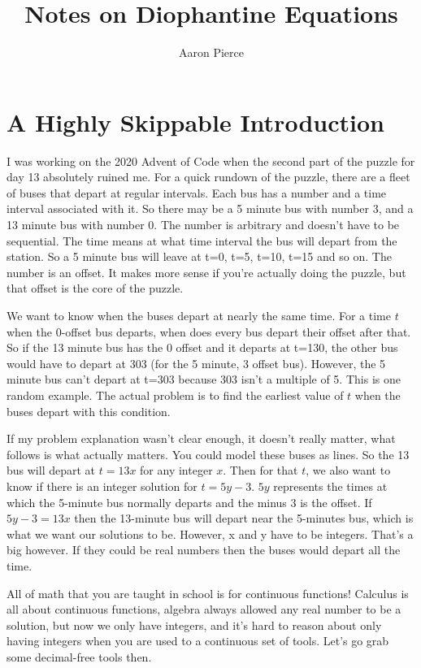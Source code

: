 \documentclass{article}
\title{Notes on Diophantine Equations}
\author{Aaron Pierce}
\date{}
\begin{document}
    \maketitle
    \section{A Highly Skippable Introduction}
    I was working on the 2020 Advent of Code when the second part of the puzzle for day 13 absolutely ruined me.
    For a quick rundown of the puzzle, there are a fleet of buses that depart at regular intervals.
    Each bus has a number and a time interval associated with it.
    So there may be a 5 minute bus with number 3, and a 13 minute bus with number 0.
    The number is arbitrary and doesn't have to be sequential.
    The time means at what time interval the bus will depart from the station.
    So a 5 minute bus will leave at t=0, t=5, t=10, t=15 and so on.
    The number is an offset.
    It makes more sense if you're actually doing the puzzle, but that offset is the core of the puzzle.

    We want to know when the buses depart at nearly the same time.
    For a time $t$ when the 0-offset bus departs, when does every bus depart their offset after that.
    So if the 13 minute bus has the 0 offset and it departs at t=130,
    the other bus would have to depart at 303 (for the 5 minute, 3 offset bus).
    However, the 5 minute bus can't depart at t=303 because 303 isn't a multiple of 5.
    This is one random example.
    The actual problem is to find the earliest value of $t$ when the buses depart with this condition.

    If my problem explanation wasn't clear enough, it doesn't really matter, what follows is what actually matters.
    You could model these buses as lines.
    So the 13 bus will depart at $t=13x$ for any integer $x$.
    Then for that $t$, we also want to know if there is an integer solution for $t = 5y - 3$.
    $5y$ represents the times at which the 5-minute bus normally departs and the minus 3 is the offset.
    If $5y-3 = 13x$ then the 13-minute bus will depart near the 5-minutes bus, which is what we want our solutions to be.
    However, x and y have to be integers.
    That's a big however.
    If they could be real numbers then the buses would depart all the time.

    All of math that you are taught in school is for continuous functions!
    Calculus is all about continuous functions, algebra always allowed any real number to be a solution, 
    but now we only have integers, and it's hard to reason about only having integers when you are used to a continuous set of tools.
    Let's go grab some decimal-free tools then.
\end{document}
